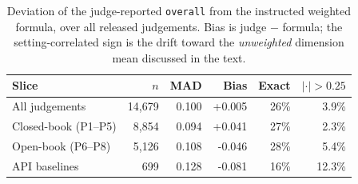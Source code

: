 \begin{table}[H]\centering\footnotesize
\caption{Deviation of the judge-reported \texttt{overall} from the instructed weighted formula, over all released judgements. Bias is judge $-$ formula; the setting-correlated sign is the drift toward the \emph{unweighted} dimension mean discussed in the text.}
\label{tab:judgedev}
\setlength{\tabcolsep}{3pt}
\begin{tabular}{@{}lrrrrr@{}}
\toprule
Slice & $n$ & MAD & Bias & Exact & $|{\cdot}|{>}0.25$ \\ \midrule
All judgements & 14,679 & 0.100 & +0.005 & 26\% & 3.9\% \\
Closed-book (P1--P5) & 8,854 & 0.094 & +0.041 & 27\% & 2.3\% \\
Open-book (P6--P8) & 5,126 & 0.108 & -0.046 & 28\% & 5.4\% \\
API baselines & 699 & 0.128 & -0.081 & 16\% & 12.3\% \\
\bottomrule
\end{tabular}
\end{table}
